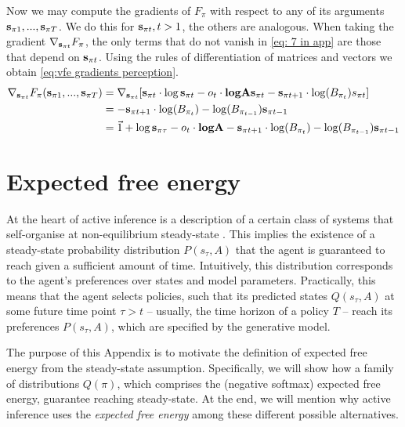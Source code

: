 \documentclass[review,12pt,authoryear]{elsarticle}
\begin{document}
Now we may compute the gradients of $F_\pi$ with respect to any of its arguments $\bold s_{\pi 1},...,\bold s_{\pi T}$. We do this for $\bold s_{\pi t}, t>1$, the others are analogous. When taking the gradient $\nabla _{\bold s_{\pi t}} F_\pi$, the only terms that do not vanish in \eqref{eq: 7 in app} are those that depend on $\bold s_{\pi t}$. Using the rules of differentiation of matrices and vectors \citep{petersenMatrixCookbook2012} we obtain \eqref{eq:vfe gradients perception}.
 \begin{equation}
  	    \begin{split}
        \nabla _{\bold s_{\pi t}} F_\pi(\bold s_{\pi 1},...,\bold s_{\pi T}) &= \nabla _{\bold s_{\pi t}}[ \bold s_{\pi t } \cdot \log \bold s_{\pi t } 
        -  o_t \cdot \textbf{log} \bold A \bold s_{\pi t }-\bold s_{\pi t+1} \cdot \log (B_{\pi_{ t}})s_{\pi t}] \\
        &= -\bold s_{\pi t+1} \cdot \log (B_{\pi_{ t}}) -\log (B_{\pi_{ t-1}}) \bold s_{\pi t-1} \\
        &=\vec {1} +\log  \bold s_{\pi\tau} - o_t \cdot \textbf{log} \bold A-\bold s_{\pi t+1} \cdot \log (B_{\pi_{ t}}) -\log (B_{\pi_{ t-1}}) \bold s_{\pi t-1}
    \end{split}
\end{equation}


\section{Expected free energy}
\label{Appendix:steady-state lemma}

At the heart of active inference is a description of a certain class of systems that self-organise at non-equilibrium steady-state \citep{parrMarkovBlanketsInformation2019,fristonFreeEnergyPrinciple2019}. This implies the existence of a steady-state probability distribution $P(s_\tau,A)$ that the agent is guaranteed to reach given a sufficient amount of time. Intuitively, this distribution corresponds to the agent's preferences over states and model parameters. Practically, this means that the agent selects policies, such that its predicted states $Q(s_\tau,A)$ at some future time point $\tau >t$ -- usually, the time horizon of a policy $T$ -- reach its preferences $P(s_\tau,A)$, which are specified by the generative model.

The purpose of this Appendix is to motivate the definition of expected free energy from the steady-state assumption. Specifically, we will show how a family of distributions $Q(\pi)$, which comprises the (negative softmax) expected free energy, guarantee reaching steady-state. At the end, we will mention why active inference uses the \textit{expected free energy} among these different possible alternatives.
\end{document}
